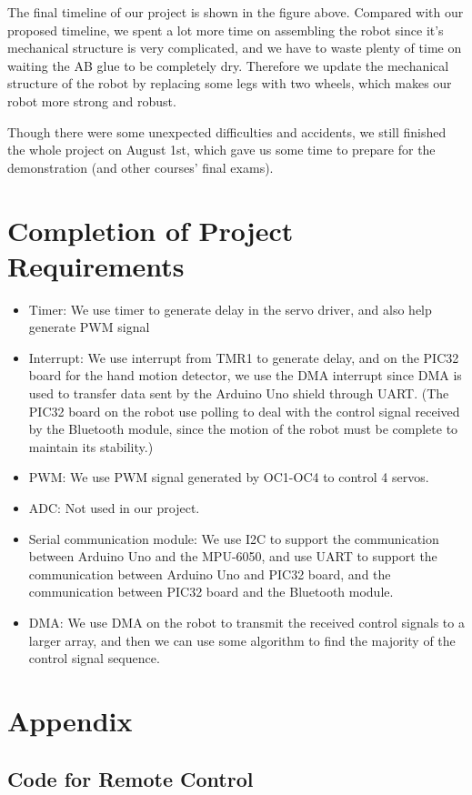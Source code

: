 \documentclass[a4paper]{article}
\begin{document}
The final timeline of our project is shown in the figure above. Compared with our proposed timeline, we spent a lot more time on assembling the robot since it's mechanical structure is very complicated, and we have to waste plenty of time on waiting the AB glue to be completely dry. Therefore we update the mechanical structure of the robot by replacing some legs with two wheels, which makes our robot more strong and robust.

Though there were some unexpected difficulties and accidents, we still finished the whole project on August 1st, which gave us some time to prepare for the demonstration (and other courses' final exams).

\section{Completion of Project Requirements}
\begin{itemize}
  \item Timer: We use timer to generate delay in the servo driver, and also help generate PWM signal
  \item Interrupt: We use interrupt from TMR1 to generate delay, and on the PIC32 board for the hand motion detector, we use the DMA interrupt since DMA is used to transfer data sent by the Arduino Uno shield through UART. (The PIC32 board on the robot use polling to deal with the control signal received by the Bluetooth module, since the motion of the robot must be complete to maintain its stability.)
  \item PWM: We use PWM signal generated by OC1-OC4 to control 4 servos.
  \item ADC: Not used in our project.
  \item Serial communication module: We use I2C to support the communication between Arduino Uno and the MPU-6050, and use UART to support the communication between Arduino Uno and PIC32  board, and the communication between PIC32 board and the Bluetooth module.
  \item DMA: We use DMA on the robot to transmit the received control signals to a larger array, and then we can use some algorithm to find the majority of the control signal sequence.
\end{itemize}
\printbibliography
\section*{Appendix}
\subsection*{Code for Remote Control}
\end{document}
